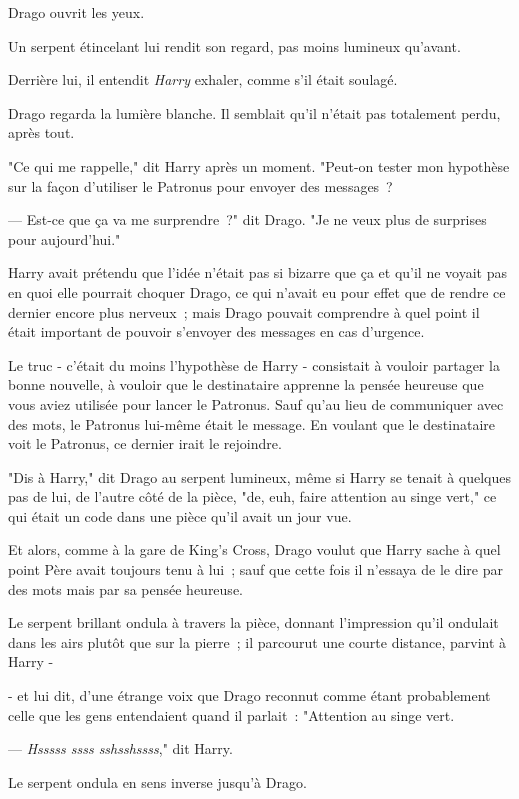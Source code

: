 Drago ouvrit les yeux.

Un serpent étincelant lui rendit son regard, pas moins lumineux qu'avant.

Derrière lui, il entendit \emph{Harry} exhaler, comme s'il était soulagé.

Drago regarda la lumière blanche. Il semblait qu'il n'était pas totalement perdu, après tout.

"Ce qui me rappelle," dit Harry après un moment. "Peut-on tester mon hypothèse sur la façon d'utiliser le Patronus pour envoyer des messages~?

--- Est-ce que ça va me surprendre~?" dit Drago. "Je ne veux plus de surprises pour aujourd'hui."

\later

Harry avait prétendu que l'idée n'était pas si bizarre que ça et qu'il ne voyait pas en quoi elle pourrait choquer Drago, ce qui n'avait eu pour effet que de rendre ce dernier encore plus nerveux~; mais Drago pouvait comprendre à quel point il était important de pouvoir s'envoyer des messages en cas d'urgence.

Le truc - c'était du moins l'hypothèse de Harry - consistait à vouloir partager la bonne nouvelle, à vouloir que le destinataire apprenne la pensée heureuse que vous aviez utilisée pour lancer le Patronus. Sauf qu'au lieu de communiquer avec des mots, le Patronus lui-même était le message. En voulant que le destinataire voit le Patronus, ce dernier irait le rejoindre.

"Dis à Harry," dit Drago au serpent lumineux, même si Harry se tenait à quelques pas de lui, de l'autre côté de la pièce, "de, euh, faire attention au singe vert," ce qui était un code dans une pièce qu'il avait un jour vue.

Et alors, comme à la gare de King's Cross, Drago voulut que Harry sache à quel point Père avait toujours tenu à lui~; sauf que cette fois il n'essaya de le dire par des mots mais par sa pensée heureuse.

Le serpent brillant ondula à travers la pièce, donnant l'impression qu'il ondulait dans les airs plutôt que sur la pierre~; il parcourut une courte distance, parvint à Harry -

- et lui dit, d'une étrange voix que Drago reconnut comme étant probablement celle que les gens entendaient quand il parlait~: "Attention au singe vert.

--- \emph{Hsssss ssss sshsshssss}," dit Harry.

Le serpent ondula en sens inverse jusqu'à Drago.

